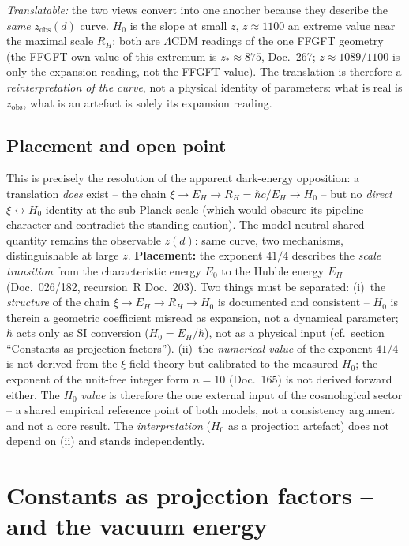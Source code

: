 \emph{Translatable:} the two views convert into one another because they
describe the \emph{same} $z_{\text{obs}}(d)$ curve. $H_0$ is the slope at small
$z$, $z\approx 1100$ an extreme value near the maximal scale $R_H$; both are
$\Lambda$CDM readings of the one FFGFT geometry (the FFGFT-own value of this
extremum is $z_*\approx 875$, Doc.~267; $z\approx 1089/1100$ is only the expansion
reading, not the FFGFT value). The translation is therefore
a \emph{reinterpretation of the curve}, not a physical identity of parameters:
what is real is $z_{\text{obs}}$, what is an artefact is solely its expansion
reading.

\subsection*{Placement and open point}

This is precisely the resolution of the apparent dark-energy opposition: a
translation \emph{does} exist -- the chain $\xi \to E_H \to R_H = \hbar c/E_H
\to H_0$ -- but no \emph{direct} $\xi \leftrightarrow H_0$ identity at the
sub-Planck scale (which would obscure its pipeline character and contradict
the standing caution). The model-neutral shared quantity remains the
observable $z(d)$: same curve, two mechanisms, distinguishable at large $z$.
\textbf{Placement:} the exponent $41/4$ describes the
\emph{scale transition} from the characteristic energy $E_0$ to
the Hubble energy $E_H$ (Doc.~026/182, recursion~R Doc.~203). Two things must be separated:
(i)~the \emph{structure} of the chain $\xi\to E_H\to R_H\to H_0$ is documented
and consistent -- $H_0$ is therein a geometric coefficient misread as
expansion, not a dynamical parameter; $\hbar$ acts only as SI conversion
($H_0=E_H/\hbar$), not as a physical input (cf.\ section \enquote{Constants as
projection factors}). (ii)~the \emph{numerical value} of the exponent $41/4$
is not derived from the $\xi$-field theory but calibrated to the measured
$H_0$; the exponent of the unit-free integer form $n=10$ (Doc.~165) is not
derived forward either. The $H_0$ \emph{value} is therefore the one external
input of the cosmological sector -- a shared empirical reference point of both
models, not a consistency argument and not a core result. The
\emph{interpretation} ($H_0$ as a projection artefact)
does not depend on (ii) and stands independently.


\section{Constants as projection factors -- and the vacuum energy}

